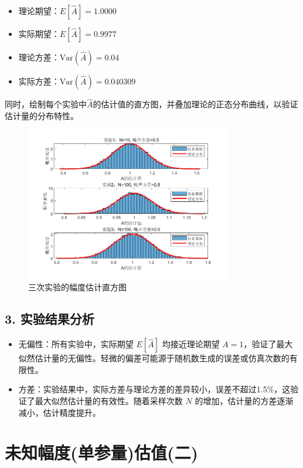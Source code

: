 \documentclass[12pt]{ctexart}
\begin{document}
\begin{itemize}
    \item 理论期望：\( E[\hat{A}] = 1.0000 \)
    \item 实际期望：\( E[\hat{A}] = 0.9977 \)
    \item 理论方差：\( \text{Var}(\hat{A}) = 0.04 \)
    \item 实际方差：\( \text{Var}(\hat{A}) = 0.040309 \)
\end{itemize}

同时，绘制每个实验中$\hat A$的估计值的直方图，并叠加理论的正态分布曲线，以验证估计量的分布特性。

\begin{figure}[H]
    \centering
    \includegraphics[width=0.8\textwidth]{image/output1.png}
    \caption{三次实验的幅度估计直方图}
\end{figure}

\subsection*{3. 实验结果分析}

\begin{itemize}
    \item 无偏性：所有实验中，实际期望 \( E[\hat{A}] \) 均接近理论期望 \( A = 1 \)，验证了最大似然估计量的无偏性。轻微的偏差可能源于随机数生成的误差或仿真次数的有限性。
    \item 方差：实验结果中，实际方差与理论方差的差异较小，误差不超过1.5\%，这验证了最大似然估计量的有效性。随着采样次数 \( N \) 的增加，估计量的方差逐渐减小，估计精度提升。
\end{itemize}

\section*{未知幅度(单参量)估值(二)}
\end{document}
